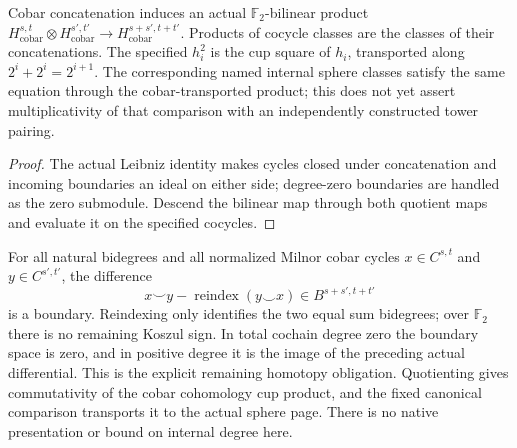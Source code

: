 \begin{proposition}
  \label{prop:milnor-cobar-cup-descent}
  \leanok
  Cobar concatenation induces an actual $\mathbb F_2$-bilinear product
  $H^{s,t}_{\mathrm{cobar}}\otimes H^{s',t'}_{\mathrm{cobar}}
  \to H^{s+s',t+t'}_{\mathrm{cobar}}$.
  Products of cocycle classes are the classes of their concatenations.
  The specified $h_i^2$ is the cup square of $h_i$, transported along
  $2^i+2^i=2^{i+1}$. The corresponding named internal sphere classes satisfy
  the same equation through the cobar-transported product; this does not yet
  assert multiplicativity of that comparison with an independently constructed
  tower pairing.
\end{proposition}
\begin{proof}
  The actual Leibniz identity makes cycles closed under concatenation and
  incoming boundaries an ideal on either side; degree-zero boundaries
  are handled as the zero submodule. Descend the bilinear map through both
  quotient maps and evaluate it on the specified cocycles.
  \leanok
\end{proof}

\begin{proposition}
  \label{prop:milnor-cobar-cup-commutator}
  \notready
  For all natural bidegrees and all normalized Milnor cobar cycles
  $x\in C^{s,t}$ and $y\in C^{s',t'}$, the difference
  \[
    x\mathbin{\smile}y-
      \operatorname{reindex}(y\mathbin{\smile}x)
       \in B^{s+s',t+t'}
  \]
  is a boundary. Reindexing only identifies the two equal sum
  bidegrees; over $\mathbb F_2$ there is no remaining Koszul sign.
  In total cochain degree zero the boundary space is zero, and in
  positive degree it is the image of the preceding actual differential.
  This is the explicit remaining homotopy obligation. Quotienting
  gives commutativity of the cobar cohomology cup product, and the
  fixed canonical comparison transports it to the actual sphere page.
  There is no native presentation or bound on internal degree here.
\end{proposition}

